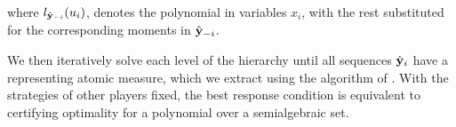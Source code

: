 where $l_{\hat{\mathbf{y}}_{-i}}(u_i)$, denotes the polynomial in variables $x_i$, with the rest substituted for the corresponding moments in $\hat{\mathbf{y}}_{-i}$.

We then iteratively solve each level of the hierarchy until all sequences $\hat{\mathbf{y}}_i$ have a representing atomic measure, which we extract using the algorithm of \textcite[Algorithm 6.9]{Lasserre15:book}. With the strategies of other players fixed, the best response condition is equivalent to certifying optimality for a polynomial over a semialgebraic set.
